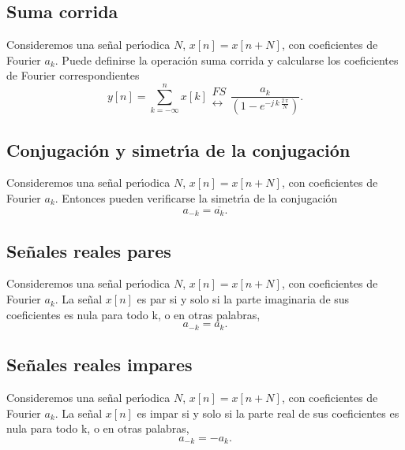 \subsection{Suma corrida}

Consideremos una se\~{n}al per\'{\i}odica $N$, $x\left[ n\right]
=x\left[ n+N\right]$, con coeficientes de Fourier
$a_{k}$. 
Puede definirse la operaci\'{o}n suma corrida y
calcularse los coeficientes de Fourier correspondientes
\begin{equation}
y\left[ n\right] =\sum_{k=-\infty }^nx\left[ k\right] 
\begin{array}{l}
FS \\ 
\longleftrightarrow
\end{array}
 \frac{a_{k}}{\left( 1-e^{-j \, k \, \frac{2 \, \pi }{N}}\right) }.
\end{equation}

\subsection{Conjugaci\'{o}n y simetr\'{\i}a de la conjugaci\'{o}n}

Consideremos una se\~{n}al per\'{\i}odica $N$, $x\left[ n\right]
=x\left[ n+N\right]$, con coeficientes de Fourier
$a_{k}$. Entonces pueden verificarse la simetr\'{\i}a de la conjugaci\'{o}n
\begin{equation}
a_{-k}=\overline{a_{k}}.
\end{equation}

\subsection{Se\~{n}ales reales pares}

Consideremos una se\~{n}al per\'{\i}odica $N$, $x\left[ n\right]
=x\left[ n+N\right]$, con coeficientes de Fourier
$a_{k}$. La se\~{n}al $x[n]$ es par si y solo si la parte imaginaria
de sus coeficientes es nula para todo k, o en otras palabras,
\begin{equation}
a_{-k}=a_{k}.
\end{equation}

\subsection{Se\~{n}ales reales impares}

Consideremos una se\~{n}al per\'{\i}odica $N$, $x\left[ n\right]
=x\left[ n+N\right]$, con coeficientes de Fourier
$a_{k}$. La se\~{n}al $x[n]$ es impar si y solo si la parte real
de sus coeficientes es nula para todo k, o en otras palabras,
\begin{equation}
a_{-k} = -a_{k}.
\end{equation}

